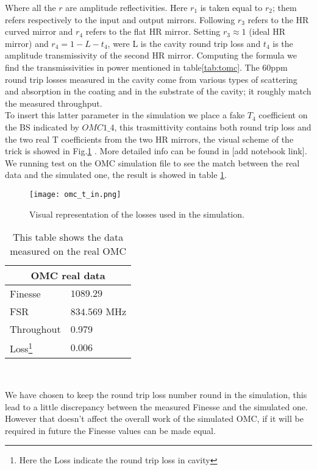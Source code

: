 \documentclass[color,DIV12,pdftex,a4paper]{virgo-note}
\begin{document}
Where all the $r$ are amplitude reflectivities. Here $r_1$ is taken equal to $r_2$; them refers respectively to the input and output mirrors. Following $r_3$ refers to the HR curved mirror and $r_4$ refers to the flat HR mirror. Setting $r_3\approx 1$ (ideal HR mirror) and $r_4=1-L-t_4$, were L is the cavity round trip loss and $t_4$ is the amplitude transmissivity of the second HR mirror. Computing the formula we find the transmissivities in power mentioned in table\ref{tab:tomc}. The 60ppm round trip losses measured in the cavity come from various types of scattering and absorption in the coating  and in the substrate of the cavity; it roughly match the measured throughput. \\ To insert this latter parameter in the simulation we place a fake $T_4$ coefficient on the BS indicated by $OMC1\_4$, this trasmittivity contains both round trip loss and the two real T coefficients from the two HR mirrors, the visual scheme of the trick is showed in Fig.\ref{fig:omc} . More detailed info can be found in [add notebook link]. \\
We running test on the OMC simulation file to see the match between the real data and the simulated one, the result is showed in table \ref{tab:sim}.
\begin{figure}[h!]
    \centering
    \texttt{[image: omc\_t\_in.png]}
    \caption{Visual representation of the losses used in the simulation.}
    \label{fig:omc}
\end{figure}
\begin{table}[t]
\begin{center}
\begin{tabular}{ |l|l| }
  \hline
  \multicolumn{2}{|c|}{OMC real data} \\
  \hline
  Finesse & $1089.29$ \\
  FSR & $834.569$ MHz \\
  Throughout & 0.979\\
  Loss\footnote{Here the Loss indicate the round trip loss in cavity} & $0.006$\\
  \hline
 \end{tabular}\\
 \caption{This table shows the data measured on the real OMC}
\label{tab:sim}
\end{center}
\end{table}
We have chosen to keep the round trip loss number round in the simulation, this lead to a little discrepancy between the measured Finesse and the simulated one. However that doesn't affect the overall work of the simulated OMC, if it will be required in future the Finesse values can be made equal.
\end{document}
